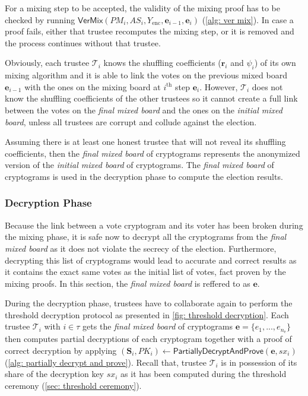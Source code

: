 For a mixing step to be accepted, the validity of the mixing proof has to be checked by running $\mathsf{VerMix}(PM_i, AS_i, Y_\mathrm{enc}, \boldsymbol{e}_{i-1}, \boldsymbol{e}_i)$ (\cref{alg: ver mix}). In case a proof fails, either that trustee recomputes the mixing step, or it is removed and the process continues without that trustee.

Obviously, each trustee $\mathcal{T}_i$ knows the shuffling coefficients ($\boldsymbol{r}_i$ and $\psi_i$) of its own mixing algorithm and it is able to link the votes on the previous mixed board $\boldsymbol{e}_{i-1}$ with the ones on the mixing board at $i^\mathrm{th}$ step $\boldsymbol{e}_i$. However, $\mathcal{T}_i$ does not know the shuffling coefficients of the other trustees so it cannot create a full link between the votes on the \textit{final mixed board} and the ones on the \textit{initial mixed board}, unless all trustees are corrupt and collude against the election.

Assuming there is at least one honest trustee that will not reveal its shuffling coefficients, then the \textit{final mixed board} of cryptograms represents the anonymized version of the \textit{initial mixed board} of cryptograms. The \textit{final mixed board} of cryptograms is used in the decryption phase to compute the election results.


\subsubsection{Decryption Phase} \label{sec: decryption phase}
Because the link between a vote cryptogram and its voter has been broken during the mixing phase, it is safe now to decrypt all the cryptograms from the \textit{final mixed board} as it does not violate the secrecy of the election. Furthermore, decrypting this list of cryptograms would lead to accurate and correct results as it contains the exact same votes as the initial list of votes, fact proven by the mixing proofs. In this section, the \textit{final mixed board} is reffered to as $\boldsymbol{e}$.

During the decryption phase, trustees have to collaborate again to perform the threshold decryption protocol as presented in \cref{fig: threshold decryption}. Each trustee $\mathcal{T}_i$ with $i \in \tau$ gets the \textit{final mixed board} of cryptograms $\boldsymbol{e} = \{ e_1, ..., e_{n_\mathrm{e}} \}$ then computes partial decryptions of each cryptogram together with a proof of correct decryption by applying $(\boldsymbol{S}_i, PK_i) \gets \mathsf{PartiallyDecryptAndProve}(\boldsymbol{e}, sx_i)$ (\cref{alg: partially decrypt and prove}). Recall that, trustee $\mathcal{T}_i$ is in possession of its share of the decryption key $sx_i$ as it has been computed during the threshold ceremony (\cref{sec: threshold ceremony}).

